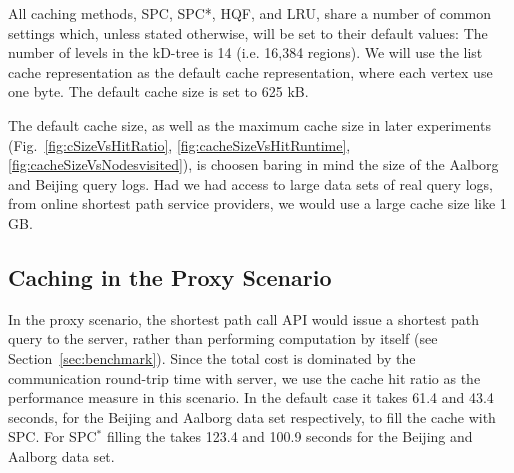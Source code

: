










All caching methods, SPC, SPC*, HQF, and LRU, share a number of common settings which, unless stated otherwise, will be set to their default values:
The number of levels in the kD-tree is 14 (i.e. 16,384 regions). We will use the list cache representation as the default cache representation, where each vertex use one byte. The default cache size is set to 625 kB.

{\color{red} 
The default cache size, as well as the maximum cache size in later experiments (Fig.~\ref{fig:cSizeVsHitRatio}, \ref{fig:cacheSizeVsHitRuntime}, \ref{fig:cacheSizeVsNodesvisited}), is choosen baring in mind the size of the Aalborg and Beijing query logs. 
Had we had access to large data sets of real query logs, from online shortest path service providers, we would use a large cache size like 1 GB.}

% 
% 
% 

% 
% 
% 





\subsection{Caching in the Proxy Scenario}\label{subsec:expProxy}
%
In the proxy scenario, the shortest path call API would issue a shortest path query to the server,
rather than performing computation by itself (see Section~\ref{sec:benchmark}).
Since the total cost is dominated by the communication round-trip time with server,
we use the cache hit ratio as the performance measure in this scenario.
In the default case it takes 61.4 and 43.4 seconds, for the Beijing and Aalborg data set respectively, to fill the cache with SPC. For SPC$^*$ filling the takes 123.4 and 100.9 seconds for the Beijing and Aalborg data set.

